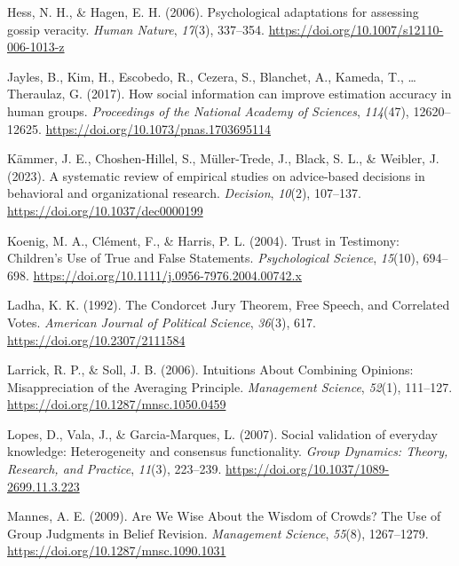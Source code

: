 \documentclass[
  doc,floatsintext]{apa6}
\newlength{\cslhangindent}
\newenvironment{CSLReferences}[2] %
 {\begin{list}{}{%
  \setlength{\itemindent}{0pt}
  \setlength{\leftmargin}{0pt}
  \setlength{\parsep}{0pt}
  \ifodd #1
   \setlength{\leftmargin}{\cslhangindent}
   \setlength{\itemindent}{-1\cslhangindent}
  \fi
  \setlength{\itemsep}{#2\baselineskip}}}
 {\end{list}}
\begin{document}
\begin{CSLReferences}{1}{0}
Hess, N. H., \& Hagen, E. H. (2006). Psychological adaptations for assessing gossip veracity. \emph{Human Nature}, \emph{17}(3), 337--354. \url{https://doi.org/10.1007/s12110-006-1013-z}

Jayles, B., Kim, H., Escobedo, R., Cezera, S., Blanchet, A., Kameda, T., \ldots{} Theraulaz, G. (2017). How social information can improve estimation accuracy in human groups. \emph{Proceedings of the National Academy of Sciences}, \emph{114}(47), 12620--12625. \url{https://doi.org/10.1073/pnas.1703695114}

Kämmer, J. E., Choshen-Hillel, S., Müller-Trede, J., Black, S. L., \& Weibler, J. (2023). A systematic review of empirical studies on advice-based decisions in behavioral and organizational research. \emph{Decision}, \emph{10}(2), 107--137. \url{https://doi.org/10.1037/dec0000199}

Koenig, M. A., Clément, F., \& Harris, P. L. (2004). Trust in Testimony: Children's Use of True and False Statements. \emph{Psychological Science}, \emph{15}(10), 694--698. \url{https://doi.org/10.1111/j.0956-7976.2004.00742.x}

Ladha, K. K. (1992). The Condorcet Jury Theorem, Free Speech, and Correlated Votes. \emph{American Journal of Political Science}, \emph{36}(3), 617. \url{https://doi.org/10.2307/2111584}

Larrick, R. P., \& Soll, J. B. (2006). Intuitions About Combining Opinions: Misappreciation of the Averaging Principle. \emph{Management Science}, \emph{52}(1), 111--127. \url{https://doi.org/10.1287/mnsc.1050.0459}

Lopes, D., Vala, J., \& Garcia-Marques, L. (2007). Social validation of everyday knowledge: Heterogeneity and consensus functionality. \emph{Group Dynamics: Theory, Research, and Practice}, \emph{11}(3), 223--239. \url{https://doi.org/10.1037/1089-2699.11.3.223}

Mannes, A. E. (2009). Are We Wise About the Wisdom of Crowds? The Use of Group Judgments in Belief Revision. \emph{Management Science}, \emph{55}(8), 1267--1279. \url{https://doi.org/10.1287/mnsc.1090.1031}


\end{CSLReferences}
\end{document}
